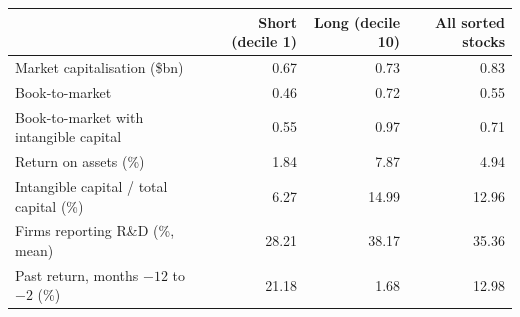 \begin{tabular}{lrrr}
\toprule
 & Short (decile 1) & Long (decile 10) & All sorted stocks \\
\midrule
Market capitalisation (\$bn) & 0.67 & 0.73 & 0.83 \\
Book-to-market & 0.46 & 0.72 & 0.55 \\
Book-to-market with intangible capital & 0.55 & 0.97 & 0.71 \\
Return on assets (\%) & 1.84 & 7.87 & 4.94 \\
Intangible capital / total capital (\%) & 6.27 & 14.99 & 12.96 \\
Firms reporting R\&D (\%, mean) & 28.21 & 38.17 & 35.36 \\
Past return, months $-12$ to $-2$ (\%) & 21.18 & 1.68 & 12.98 \\
\bottomrule
\end{tabular}
